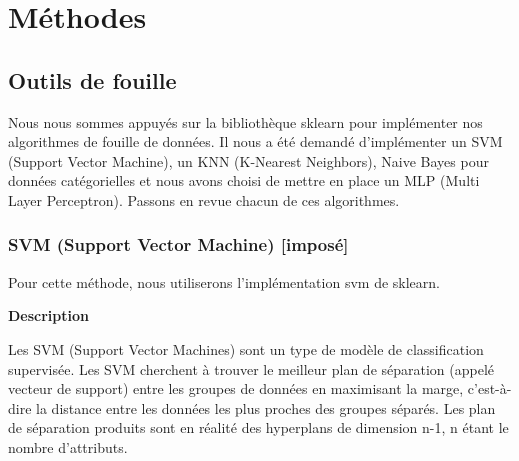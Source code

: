\documentclass{ceri/sty/rapport}
\begin{document}
\section{Méthodes}

\subsection{Outils de fouille}


Nous nous sommes appuyés sur la bibliothèque sklearn pour implémenter nos algorithmes de fouille de données. Il nous a été demandé d'implémenter un SVM (Support Vector Machine), un KNN (K-Nearest Neighbors), Naive Bayes pour données catégorielles et nous avons choisi de mettre en place un MLP (Multi Layer Perceptron).
Passons en revue chacun de ces algorithmes.

\subsubsection{SVM (Support Vector Machine) [imposé]}

Pour cette méthode, nous utiliserons l'implémentation svm de sklearn.

\textbf{Description}

Les SVM (Support Vector Machines) sont un type de modèle de classification supervisée. Les SVM cherchent à trouver le meilleur plan de séparation (appelé vecteur de support) entre les groupes de données en maximisant la marge, c'est-à-dire la distance entre les données les plus proches des groupes séparés. Les plan de séparation produits sont en réalité des hyperplans de dimension n-1, n étant le nombre d'attributs.
\end{document}

